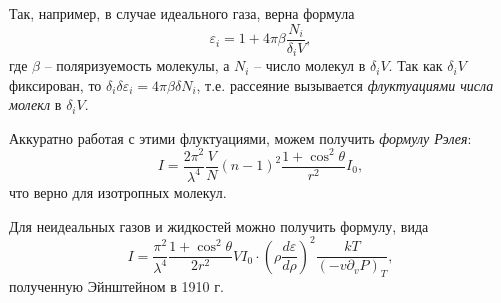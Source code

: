 Так, например, в случае идеального газа, верна формула
\begin{equation*}
    \varepsilon_i = 1 + 4 \pi \beta \frac{N_i}{\delta_i V},
\end{equation*}
где $\beta$ -- поляризуемость молекулы, а $N_i$ -- число молекул в $\delta_i V$. Так как $\delta_i V$ фиксирован, то $\delta_i \delta \varepsilon_i = 4 \pi \beta \delta N_i$, т.е. рассеяние вызывается \textit{флуктуациями числа молекл} в $\delta_i V$.


Аккуратно работая с этими флуктуациями, можем получить \textit{формулу Рэлея}:
\begin{equation*}
    I = \frac{2\pi^2}{\lambda^4} \frac{V}{N} (n-1)^2 \frac{1+\cos^2 \theta}{r^2} I_0,
\end{equation*}
что верно для изотропных молекул.


Для неидеальных газов и жидкостей можно получить формулу, вида
\begin{equation*}
    I = \frac{\pi^2}{\lambda^4} \frac{1+\cos^2 \theta}{2 r^2} V  I_0 \cdot
    \left(\rho \frac{d \varepsilon}{d \rho} \right)^2 \frac{kT}{(- v \partial_v P)_T},
\end{equation*}
полученную Эйнштейном в 1910 г. 

